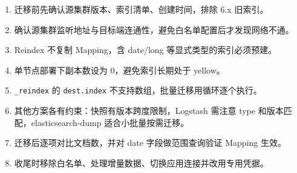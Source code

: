 \documentclass[11pt,a4paper,openany]{ctexbook}
\begin{document}
\begin{enumerate}[leftmargin=1.4em]
  \item 迁移前先确认源集群版本、索引清单、创建时间，排除 6.x 旧索引。
  \item 确认源集群监听地址与目标端连通性，避免白名单配置后才发现网络不通。
  \item Reindex 不复制 Mapping，含 date/long 等显式类型的索引必须预建。
  \item 单节点部署下副本数设为 0，避免索引长期处于 yellow。
  \item \texttt{\_reindex} 的 \texttt{dest.index} 不支持数组，批量迁移用循环逐个执行。
  \item 其他方案各有约束：快照有版本跨度限制，Logstash 需注意 type 和版本匹配，elasticsearch-dump 适合小批量按需迁移。
  \item 迁移后逐项对比文档数，并对 date 字段做范围查询验证 Mapping 生效。
  \item 收尾时移除白名单、处理增量数据、切换应用连接并改用专用凭据。
\end{enumerate}
\end{document}
